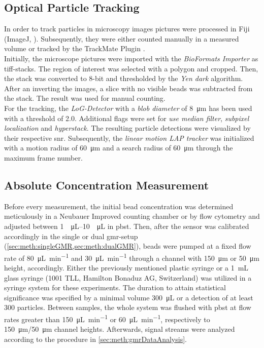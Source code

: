 \subsection{Optical Particle Tracking}
In order to track particles in microscopy images pictures were processed in Fiji (ImageJ, \cite{lit:chem:Fiji}). Subsequently, they were either counted manually in a measured volume or tracked by the TrackMate Plugin \cite{trackmate}. \\
Initially, the microscope pictures were imported with the \textit{BioFormats Importer} as tiff-stacks. The region of interest was selected with a polygon and cropped. Then, the stack was converted to 8-bit and thresholded by the \textit{Yen dark} algorithm. After an inverting the images, a slice with no visible beads was subtracted from the stack.  The result was used for manual counting.\\
For the tracking, the \textit{LoG-Detector} with a \textit{blob diameter} of \SI{8}{\micro\meter} has been used with a threshold of \num{2.0}. Additional flags were set for \textit{use median filter}, \textit{subpixel localization} and \textit{hyperstack}. The resulting particle detections were visualized by their respective \gls{snr}. Subsequently, the \textit{linear motion LAP tracker} was initialized with a motion radius of \SI{60}{\micro\meter} and a search radius of \SI{60}{\micro\meter} through the maximum frame number. 
\subsection{Absolute Concentration Measurement}
\label{sec:meth:conc}
Before every measurement, the initial bead concentration was determined meticulously in a Neubauer Improved counting chamber or by flow cytometry and adjusted between \SIrange{1}{10}{\per\micro\liter} in \gls{pbst}. Then, after the sensor was calibrated accordingly in the single or dual \gls{gmr}-setup (\cref{sec:meth:singleGMR,sec:meth:dualGMR}), beads were pumped at a fixed flow rate of \SI{80}{\micro\liter\per\minute} and \SI{30}{\micro\liter\per\minute} through a channel with \SI{150}{\micro\meter} or \SI{50}{\micro\meter} height, accordingly. Either the previously mentioned plastic syringe or a \SI{1}{\milli\liter} glass syringe (1001 TLL, Hamilton Bonaduz AG, Switzerland) was utilized in a syringe system for these experiments. The duration to attain statistical significance was specified by a minimal volume \SI{300}{\micro\liter} or a detection of at least \num{300} particles. Between samples, the whole system was flushed with \gls{pbst} at flow rates greater than \SI{150}{\micro\liter\per\minute} or \SI{60}{\micro\liter\per\minute}, respectively to \SI{150}{\micro\meter}/\SI{50}{\micro\meter} channel heights. Afterwards, signal streams were analyzed according to the procedure in \cref{sec:meth:gmrDataAnalysis}.
